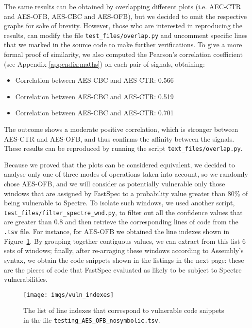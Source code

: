 \documentclass[target=mst,aauheader=aics]{thud}
\theoremstyle{definition}
\begin{document}
The same results can be obtained by overlapping different plots (i.e. AEC-CTR and AES-OFB, AES-CBC and AES-OFB), but we decided to omit the respective graphs for sake of brevity. However, those who are interested in reproducing the results, can modify the file \texttt{test\_files/overlap.py} and uncomment specific lines that we marked in the source code to make further verifications. To give a more formal proof of similarity, we also computed the Pearson's correlation coefficient (see Appendix \ref{appendix:maths}) on each pair of signals, obtaining:
\begin{itemize}
	\item Correlation between AES-CBC and AES-CTR: 0.566
	\item Correlation between AES-CBC and AES-CTR: 0.519
	\item Correlation between AES-CBC and AES-CTR: 0.701
\end{itemize}
The outcome shows a moderate positive correlation, which is stronger between AES-CTR and AES-OFB, and thus confirms the affinity between the signals. These results can be reproduced by running the script \texttt{text\_files/overlap.py}.

Because we proved that the plots can be considered equivalent, we decided to analyse only one of three modes of operations taken into account, so we randomly chose AES-OFB, and we will consider as potentially vulnerable only those windows that are assigned by FastSpec to a probability value greater than 80\% of being vulnerable to Spectre. To isolate such windows, we used another script, \texttt{test\_files/filter\_spectre\_wnd.py}, to filter out all the confidence values that are greater than 0.8 and then retrieve the corresponding lines of code from the \texttt{.tsv} file. For instance, for AES-OFB we obtained the line indexes shown in Figure~\ref{fig:idx}. By grouping together contiguous values, we can extract from this list 6 sets of windows; finally, after re-arraging these windows according to Assembly's 
syntax, we obtain the code snippets shown in the listings in the next page: these are the pieces of code that FastSpec evaluated as likely to be subject to Spectre vulnerabilities.

\begin{figure}
	\centering
	\texttt{[image: imgs/vuln\_indexes]}
	\caption{The list of line indexes that correspond to vulnerable code snippets in the file \texttt{testing\_AES\_OFB\_nosymbolic.tsv}.}
	\label{fig:idx}
\end{figure}
\end{document}
